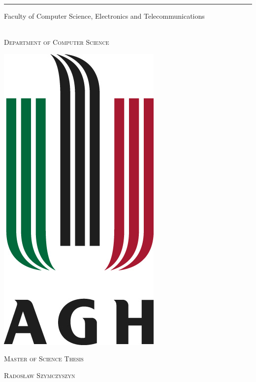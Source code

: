 
\begin{center}

\thispagestyle{empty}

{

\vspace*{1mm}\rule{\textwidth}{1mm}\vspace*{1mm}

{\large Faculty of Computer Science, Electronics and Telecommunications}}\\\vspace*{2mm}
{\large\textsc{Department of Computer Science}}\vspace*{1cm}

\includegraphics[scale=0.3]{agh}
\vspace*{1cm}

{\huge\scshape Master of Science Thesis}\\\vspace*{2cm}

{\LARGE\scshape Radosław Szymczyszyn}\\\vspace*{2cm}


\end{center}
